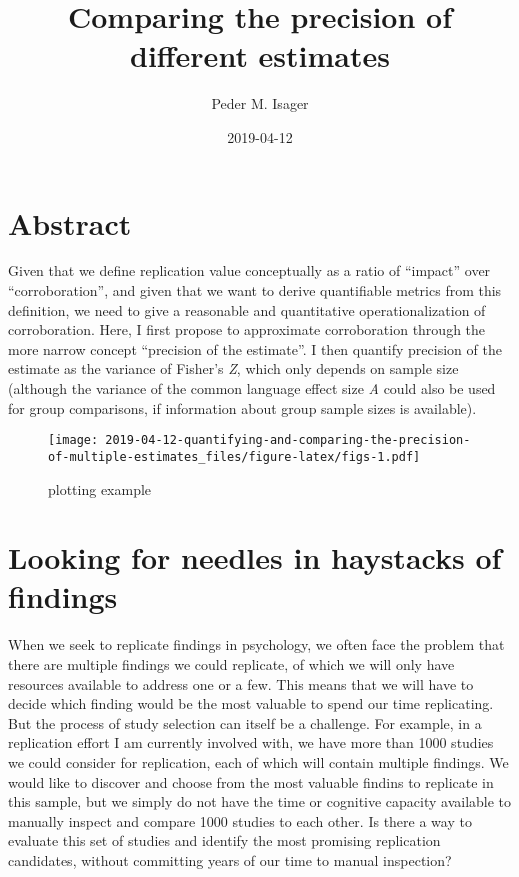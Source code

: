 \documentclass[]{article}
\title{Comparing the precision of different estimates}
\author{Peder M. Isager}
\date{2019-04-12}
\begin{document}
\maketitle

\hypertarget{abstract}{%
\section{Abstract}\label{abstract}}

Given that we define replication value conceptually as a ratio of
``impact'' over ``corroboration'', and given that we want to derive
quantifiable metrics from this definition, we need to give a reasonable
and quantitative operationalization of corroboration. Here, I first
propose to approximate corroboration through the more narrow concept
``precision of the estimate''. I then quantify precision of the estimate
as the variance of Fisher's \emph{Z}, which only depends on sample size
(although the variance of the common language effect size \emph{A} could
also be used for group comparisons, if information about group sample
sizes is available).

\begin{figure}
\centering
\texttt{[image: 2019-04-12-quantifying-and-comparing-the-precision-of-multiple-estimates\_files/figure-latex/figs-1.pdf]}
\caption{\label{fig:figs}plotting example}
\end{figure}

\hypertarget{looking-for-needles-in-haystacks-of-findings}{%
\section{Looking for needles in haystacks of
findings}\label{looking-for-needles-in-haystacks-of-findings}}

When we seek to replicate findings in psychology, we often face the
problem that there are multiple findings we could replicate, of which we
will only have resources available to address one or a few. This means
that we will have to decide which finding would be the most valuable to
spend our time replicating. But the process of study selection can
itself be a challenge. For example, in a replication effort I am
currently involved with, we have more than 1000 studies we could
consider for replication, each of which will contain multiple findings.
We would like to discover and choose from the most valuable findins to
replicate in this sample, but we simply do not have the time or
cognitive capacity available to manually inspect and compare 1000
studies to each other. Is there a way to evaluate this set of studies
and identify the most promising replication candidates, without
committing years of our time to manual inspection?
\end{document}
